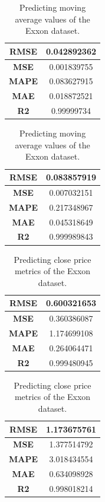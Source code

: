 \begin{table}[H]
	\centering
	\begin{minipage}{0.4\textwidth}
		\centering
		\begin{tabular}{|c|c|}
			\hline
			\textbf{RMSE} & 0.042892362 \\
			\hline
			\textbf{MSE}  & 0.001839755 \\
			\hline
			\textbf{MAPE} & 0.083627915 \\
			\hline
			\textbf{MAE}  & 0.018872521 \\
			\hline
			\textbf{R2}   & 0.99999734  \\
			\hline
		\end{tabular}
	\end{minipage}
	\begin{minipage}{0.4\textwidth}
		\centering
		\begin{tabular}{|c|c|}
			\hline
			\textbf{RMSE} & 0.083857919
			 \\
			\hline
			\textbf{MSE}  & 0.007032151
			 \\
			\hline
			\textbf{MAPE} & 0.217348967
			 \\
			\hline
			\textbf{MAE}  & 0.045318649
			 \\
			\hline
			\textbf{R2}   & 0.999989843
			  \\
			\hline
		\end{tabular}
	\end{minipage}
	\caption{Predicting moving average values of the Exxon dataset.}
	\label{exx:lstm_rnn_mva}
\end{table}
\begin{table}[H]
	\centering
	\begin{minipage}{0.4\textwidth}
		\centering
		\begin{tabular}{|c|c|}
			\hline
			\textbf{RMSE} & 0.600321653 \\
			\hline
			\textbf{MSE}  & 0.360386087 \\
			\hline
			\textbf{MAPE} & 1.174699108 \\
			\hline
			\textbf{MAE}  & 0.264064471 \\
			\hline
			\textbf{R2}   & 0.999480945 \\
			\hline
		\end{tabular}
	\end{minipage}
	\begin{minipage}{0.4\textwidth}
		\centering
		\begin{tabular}{|c|c|}
			\hline
			\textbf{RMSE} & 1.173675761
			 \\
			\hline
			\textbf{MSE}  & 1.377514792
			 \\
			\hline
			\textbf{MAPE} & 3.018434554
			  \\
			\hline
			\textbf{MAE}  & 0.634098928
			 \\
			\hline
			\textbf{R2}   & 0.998018214
			 \\
			\hline
		\end{tabular}
	\end{minipage}
	\caption{Predicting close price metrics of the Exxon dataset.}
	\label{exx:lstm_rnn_close}
\end{table}
